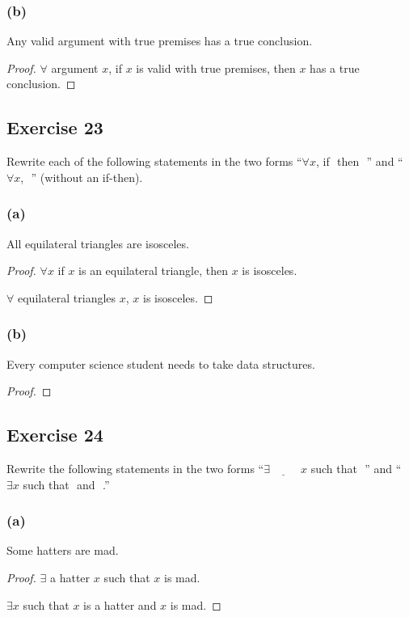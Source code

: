\documentclass[14pt]{extarticle}
\newcommand{\fbl}{\underline{\hspace{1cm}}\,\,}
\newcommand{\fa}{\forall}
\newcommand{\te}{\exists}
\begin{document}
\subsubsection{(b)}
Any valid argument with true premises has a true conclusion.

\begin{proof}
$\fa$ argument $x$, if $x$ is valid with true premises, then $x$ has a true conclusion.
\end{proof}

\subsection{Exercise 23}
Rewrite each of the following statements in the two forms “$\fa x$, if \fbl then \fbl” and “$\fa x$, \fbl” (without an if-then).

\subsubsection{(a)}
All equilateral triangles are isosceles.

\begin{proof}
$\fa x$ if $x$ is an equilateral triangle, then $x$ is isosceles.

$\fa$ equilateral triangles $x$, $x$ is isosceles.
\end{proof}

\subsubsection{(b)}
Every computer science student needs to take data structures.

\begin{proof}

\end{proof}

\subsection{Exercise 24}
Rewrite the following statements in the two forms “$\te \fbl x$ such that \fbl” and “$\te x$ such that \fbl and \fbl.”

\subsubsection{(a)}
Some hatters are mad.

\begin{proof}
$\te$ a hatter $x$ such that $x$ is mad.

$\te x$ such that $x$ is a hatter and $x$ is mad.
\end{proof}
\end{document}
